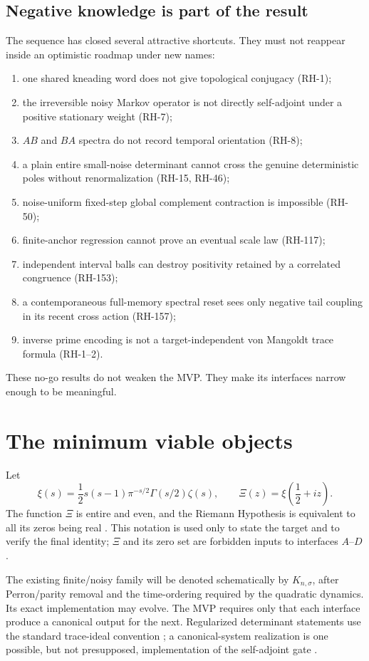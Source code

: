 \documentclass[11pt]{article}
\theoremstyle{definition}
\theoremstyle{remark}
\begin{document}
\subsection{Negative knowledge is part of the result}

The sequence has closed several attractive shortcuts.  They must not reappear
inside an optimistic roadmap under new names:
\begin{enumerate}[leftmargin=2.1em]
\item one shared kneading word does not give topological conjugacy (RH-1);
\item the irreversible noisy Markov operator is not directly self-adjoint
under a positive stationary weight (RH-7);
\item $AB$ and $BA$ spectra do not record temporal orientation (RH-8);
\item a plain entire small-noise determinant cannot cross the genuine
deterministic poles without renormalization (RH-15, RH-46);
\item noise-uniform fixed-step global complement contraction is impossible
(RH-50);
\item finite-anchor regression cannot prove an eventual scale law (RH-117);
\item independent interval balls can destroy positivity retained by a
correlated congruence (RH-153);
\item a contemporaneous full-memory spectral reset sees only negative tail
coupling in its recent cross action (RH-157);
\item inverse prime encoding is not a target-independent von Mangoldt trace
formula (RH-1--2).
\end{enumerate}

These no-go results do not weaken the MVP.  They make its interfaces narrow
enough to be meaningful.

\section{The minimum viable objects}

Let
\[
 \xi(s)=\frac12s(s-1)\pi^{-s/2}\Gamma(s/2)\zeta(s),
 \qquad \Xi(z)=\xi\!\left(\frac12+iz\right).
\]
The function $\Xi$ is entire and even, and the Riemann Hypothesis is
equivalent to all its zeros being real \citep{Titchmarsh1986}.  This notation
is used only to state the target and to verify the final identity; $\Xi$ and
its zero set are forbidden inputs to interfaces $A$--$D$.

The existing finite/noisy family will be denoted schematically by
$K_{n,\sigma}$, after Perron/parity removal and the time-ordering required by
the quadratic dynamics.  Its exact implementation may evolve.  The MVP
requires only that each interface produce a canonical output for the next.
Regularized determinant statements use the standard trace-ideal convention
\citep{Simon2005}; a canonical-system realization is one possible, but not
presupposed, implementation of the self-adjoint gate \citep{deBranges1968}.
\end{document}
